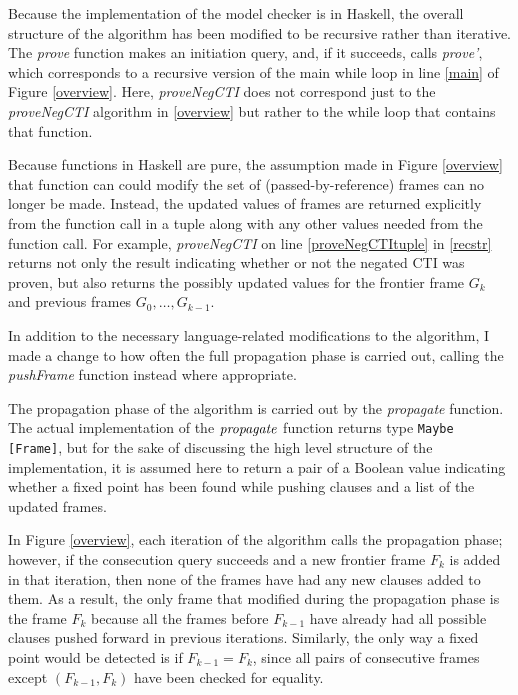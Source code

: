 \documentclass[12pt,a4paper,twoside,openright]{report}
\begin{document}
{Because the implementation of the model checker is in Haskell, the overall
structure of the algorithm has been modified to be recursive rather than iterative.
The {\it prove} function makes an initiation query, and, if it succeeds, calls
{\it prove'}, which corresponds to a recursive version of the main while loop
in line \ref{main} of Figure \ref{overview}. Here, {\it proveNegCTI}
does not correspond just to the {\it proveNegCTI} algorithm in \ref{overview} but rather
to the while loop that contains that function.

Because functions in Haskell are pure, the assumption made in Figure \ref{overview}
that function can could modify the set of (passed-by-reference) frames can no longer be made.
Instead, the updated values of frames are returned explicitly from the function call in
a tuple along with any other values needed from the function call. For example,
{\it proveNegCTI} on line \ref{proveNegCTItuple} in \ref{recstr} returns not only the result
indicating whether or not the negated CTI was proven, but also returns the possibly updated
values for the frontier frame $G_k$ and previous frames $G_0, \ldots, G_{k - 1}$.

In addition to the necessary language-related modifications to the algorithm, I made a
change to how often the full propagation phase is carried out, calling the {\it pushFrame}
function instead where appropriate.

The propagation phase of the algorithm is carried out by the {\it propagate} function.
The actual implementation of the ${\it propagate}$ function returns type \verb,Maybe [Frame],,
but for the sake of discussing the high level structure of the implementation,
it is assumed here to return a pair of a Boolean value indicating whether a fixed point
has been found while pushing clauses and a list of the updated frames.

In Figure \ref{overview}, each iteration of the algorithm calls the propagation
phase; however, if the consecution query succeeds and a new frontier frame $F_k$
is added in that iteration, then none of the frames have had any new clauses
added to them. As a result, the only frame that modified during the propagation phase
is the frame $F_k$ because all the frames before $F_{k - 1}$ have already had all
possible clauses pushed forward in previous iterations.
Similarly, the only way a fixed point would be detected is if $F_{k - 1} = F_k$,
since all pairs of consecutive frames except $(F_{k - 1}, F_k)$ have been checked for
equality.

}
\end{document}

